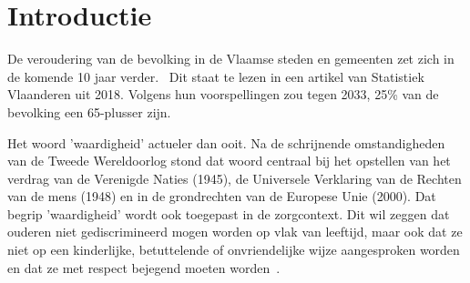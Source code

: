 

\section{Introductie}\label{sec:introductie} %

De veroudering van de bevolking in de Vlaamse steden en gemeenten zet zich in de komende 10 jaar verder.~\autocite{StatistiekVlaanderen2018} Dit staat te lezen in een artikel van Statistiek Vlaanderen uit 2018.
Volgens hun voorspellingen zou tegen 2033, 25\% van de bevolking een 65-plusser zijn.~\autocite{StatistiekVlaanderen2018}

Het woord 'waardigheid' actueler dan ooit.
Na de schrijnende omstandigheden van de Tweede Wereldoorlog stond dat woord centraal bij het opstellen van het verdrag van de Verenigde Naties (1945), de Universele Verklaring van de Rechten van de mens (1948) en in de grondrechten van de Europese Unie (2000).
Dat begrip 'waardigheid' wordt ook toegepast in de zorgcontext.
Dit wil zeggen dat ouderen niet gediscrimineerd mogen worden op vlak van leeftijd, maar ook dat ze niet op een kinderlijke, betuttelende of onvriendelijke wijze aangesproken worden en dat ze met respect bejegend moeten worden~\autocite{Campens}.

